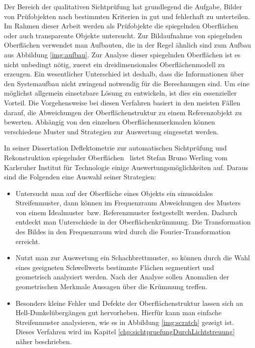 Der Bereich der qualitativen Sichtprüfung hat grundlegend die Aufgabe, Bilder von Prüf\-ob\-jek\-ten nach bestimmten Kriterien in gut und fehlerhaft zu unterteilen.
Im Rahmen dieser Arbeit werden als Prüfobjekte die spiegelnden Oberflächen oder auch transparente Objekte untersucht.
Zur Bildaufnahme von spiegelnden Oberflächen verwendet man Aufbauten, die in der Regel ähnlich sind zum Aufbau aus Abbildung \ref{img:aufbau}.
Zur Analyse dieser spiegelnden Oberflächen ist es nicht unbedingt nötig, zuerst ein dreidimensionales Oberflächenmodell zu erzeugen.
Ein wesentlicher Unterschied ist deshalb, dass die Informationen über den Systemaufbau nicht zwingend notwendig für die Berechnungen sind.
Um eine möglichst allgemein einsetzbare Lösung zu entwickeln, ist dies ein essenzieller Vorteil.
Die Vorgehensweise bei diesen Verfahren basiert in den meisten Fällen darauf, die Abweichungen der Oberflächenstruktur zu einem Referenzobjekt zu bewerten.
Abhängig von den einzelnen Oberflächenmerkmalen können verschiedene Muster und Strategien zur Auswertung eingesetzt werden.

\p
In seiner Dissertation \glqq Deflektometrie zur automatischen Sichtprüfung und Rekonstruktion spiegelnder Oberflächen\grqq ~\cite{kit_werling} listet Stefan Bruno Werling vom Karlsruher Institut für Technologie einige Auswertungsmöglichkeiten auf.
Daraus sind die Folgenden eine Auswahl seiner Strategien:

\begin{itemize}
	\item Untersucht man auf der Oberfläche eines Objekts ein sinusoidales Streifenmuster, dann können im Frequenzraum Abweichungen des Musters von einem \glqq Idealmuster\grqq ~bzw. Referenzmuster festgestellt werden.
	Dadurch entdeckt man Unterschiede in der Oberflächenkrüm\-mung.
	Die Transformation des Bildes in den Frequenzraum wird durch die Fourier-Transformation erreicht.
	
	\item Nutzt man zur Auswertung ein Schachbrettmuster, so können durch die Wahl eines geeigneten Schwellwerts bestimmte Flächen segmentiert und geometrisch analysiert werden.
	Nach der Analyse sollen Anomalien der geometrischen Merkmale Aussagen über die Krümmung treffen.
	
	\item Besonders kleine Fehler und Defekte der Oberflächenstruktur lassen sich an Hell-Dunkelübergängen gut hervorheben.
	Hierfür kann man einfache Streifenmuster analysieren, wie es in Abbildung \ref{img:scratch} gezeigt ist.
	Dieses Verfahren wird im Kapitel \ref{chp:sichtpruefungDurchLichtstreuung} näher beschrieben.
\end{itemize}

